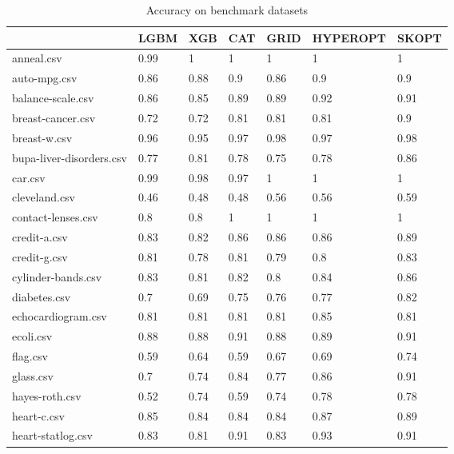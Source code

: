 \documentclass[a4paper,twoside,12pt]{book}
\begin{document}
\begin{table}[t]
\begin{tabular}{lllllll}
\toprule
{} &  LGBM &   XGB &   CAT &  GRID & HYPEROPT & SKOPT \\
\midrule
anneal.csv               &  0.99 &     1 &     1 &     1 &        1 &     1 \\
auto-mpg.csv             &  0.86 &  0.88 &   0.9 &  0.86 &      0.9 &   0.9 \\
balance-scale.csv        &  0.86 &  0.85 &  0.89 &  0.89 &     0.92 &  0.91 \\
breast-cancer.csv        &  0.72 &  0.72 &  0.81 &  0.81 &     0.81 &   0.9 \\
breast-w.csv             &  0.96 &  0.95 &  0.97 &  0.98 &     0.97 &  0.98 \\
bupa-liver-disorders.csv &  0.77 &  0.81 &  0.78 &  0.75 &     0.78 &  0.86 \\
car.csv                  &  0.99 &  0.98 &  0.97 &     1 &        1 &     1 \\
cleveland.csv            &  0.46 &  0.48 &  0.48 &  0.56 &     0.56 &  0.59 \\
contact-lenses.csv       &   0.8 &   0.8 &     1 &     1 &        1 &     1 \\
credit-a.csv             &  0.83 &  0.82 &  0.86 &  0.86 &     0.86 &  0.89 \\
credit-g.csv             &  0.81 &  0.78 &  0.81 &  0.79 &      0.8 &  0.83 \\
cylinder-bands.csv       &  0.83 &  0.81 &  0.82 &   0.8 &     0.84 &  0.86 \\
diabetes.csv             &   0.7 &  0.69 &  0.75 &  0.76 &     0.77 &  0.82 \\
echocardiogram.csv       &  0.81 &  0.81 &  0.81 &  0.81 &     0.85 &  0.81 \\
ecoli.csv                &  0.88 &  0.88 &  0.91 &  0.88 &     0.89 &  0.91 \\
flag.csv                 &  0.59 &  0.64 &  0.59 &  0.67 &     0.69 &  0.74 \\
glass.csv                &   0.7 &  0.74 &  0.84 &  0.77 &     0.86 &  0.91 \\
hayes-roth.csv           &  0.52 &  0.74 &  0.59 &  0.74 &     0.78 &  0.78 \\
heart-c.csv              &  0.85 &  0.84 &  0.84 &  0.84 &     0.87 &  0.89 \\
heart-statlog.csv        &  0.83 &  0.81 &  0.91 &  0.83 &     0.93 &  0.91 \\
\bottomrule
\end{tabular}
\caption{Accuracy on benchmark datasets}
\label{tab:benchmarki}
\end{table}
\end{document}
